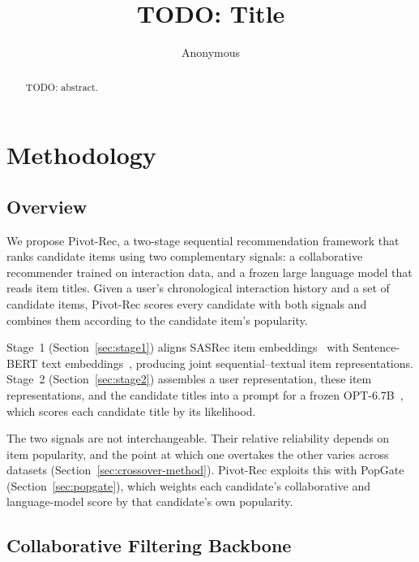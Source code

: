 \documentclass[runningheads]{llncs}
\begin{document}
\title{TODO: Title}

\author{Anonymous}

\maketitle

\begin{abstract}
TODO: abstract.
\end{abstract}

\section{Methodology}
\label{sec:methodology}

\subsection{Overview}
\label{sec:overview}

We propose Pivot-Rec, a two-stage sequential recommendation framework that ranks
candidate items using two complementary signals: a collaborative recommender
trained on interaction data, and a frozen large language model that reads item
titles. Given a user's chronological interaction history and a set of candidate
items, Pivot-Rec scores every candidate with both signals and combines them
according to the candidate item's popularity.

Stage~1 (Section~\ref{sec:stage1}) aligns SASRec item embeddings~\cite{sasrec}
with Sentence-BERT text embeddings~\cite{reimers2019sentence}, producing joint
sequential--textual item representations. Stage~2 (Section~\ref{sec:stage2})
assembles a user representation, these item representations, and the candidate
titles into a prompt for a frozen OPT-6.7B~\cite{opt}, which scores each
candidate title by its likelihood.

The two signals are not interchangeable. Their relative reliability depends on
item popularity, and the point at which one overtakes the
other varies across datasets (Section~\ref{sec:crossover-method}). Pivot-Rec
exploits this with PopGate (Section~\ref{sec:popgate}), which weights each
candidate's collaborative and language-model score by that candidate's own
popularity.


\subsection{Collaborative Filtering Backbone}
\label{sec:cf}
\end{document}
